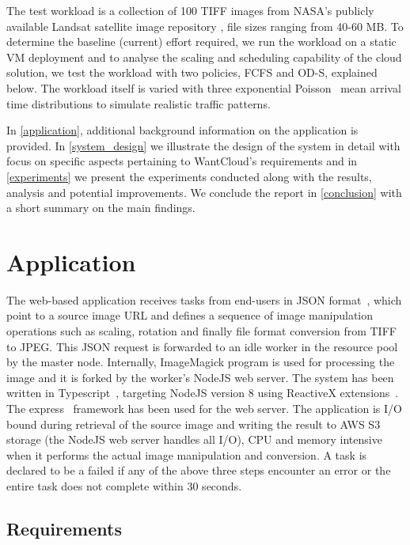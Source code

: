 \documentclass[a4paper]{IEEEtran}
\begin{document}
The test workload is a collection of 100 TIFF images from NASA's publicly available Landsat satellite image repository \cite{landsat_s3}, file sizes ranging from 40-60 MB. To determine the baseline (current) effort required, we run the workload on a static VM deployment and to analyse the scaling and scheduling capability of the cloud solution, we test the workload with two policies, \textsc{FCFS} and \textsc{OD-S}, explained below. The workload itself is varied with three exponential Poisson~\cite{jain1990art} mean arrival time distributions to simulate realistic traffic patterns.

In \autoref{application}, additional background information on the application is provided. In \autoref{system_design} we illustrate the design of the system in detail with focus on specific aspects pertaining to WantCloud's requirements and in \autoref{experiments} we present the experiments conducted along with the results, analysis and potential improvements. We conclude the report in \autoref{conclusion} with a short summary on the main findings.


\section{Application} \label{application}

The web-based application receives tasks from end-users in JSON format~\cite{rfc7159}, which point to a source image URL and defines a sequence of image manipulation operations such as scaling, rotation and finally file format conversion from TIFF to JPEG. This JSON request is forwarded to an idle worker in the resource pool by the master node. Internally, ImageMagick program is used for processing the image and it is forked by the worker's NodeJS web server. The system has been written in Typescript~\cite{typescript}, targeting NodeJS version 8 using ReactiveX extensions~\cite{reactivex}. The express~\cite{express} framework has been used for the web server. The application is I/O bound during retrieval of the source image and writing the result to AWS S3 storage (the NodeJS web server handles all I/O), CPU and memory intensive when it performs the actual image manipulation and conversion. A task is declared to be a failed if any of the above three steps encounter an error or the entire task does not complete within 30 seconds.

\subsection{Requirements}
\end{document}
